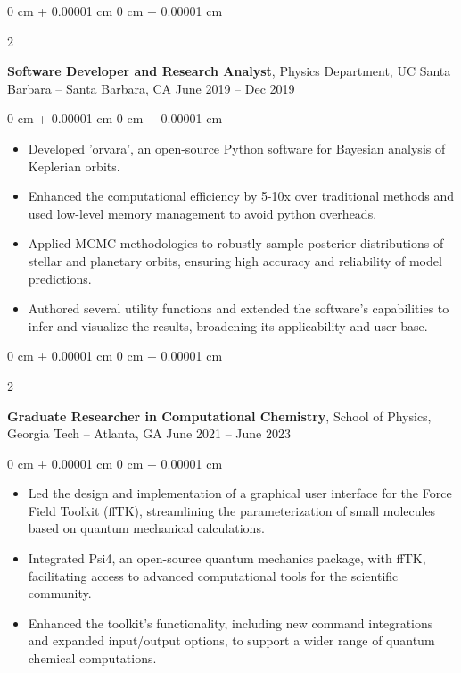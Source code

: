 \documentclass[10pt, letterpaper]{article}
\newenvironment{highlights}{
    \begin{itemize}[
        topsep=0.10 cm,
        parsep=0.10 cm,
        partopsep=0pt,
        itemsep=0pt,
        leftmargin=0 cm + 10pt
    ]
}{
    \end{itemize}
} %
\newenvironment{onecolentry}{
    \begin{adjustwidth}{
        0 cm + 0.00001 cm
    }{
        0 cm + 0.00001 cm
    }
}{
    \end{adjustwidth}
} %
\newenvironment{twocolentry}[2][]{
    \onecolentry
    \def\secondColumn{#2}
    \setcolumnwidth{\fill, 4.5 cm}
    \begin{paracol}{2}
}{
    \switchcolumn \raggedleft \secondColumn
    \end{paracol}
    \endonecolentry
} %
\begin{document}
        \vspace{0.2 cm}

        \begin{twocolentry}{
            June 2019 – Dec 2019
        }
            \textbf{Software Developer and Research Analyst}, Physics Department, UC Santa Barbara -- Santa Barbara, CA\end{twocolentry}

        \vspace{0.10 cm}
        \begin{onecolentry}
            \begin{highlights}
                \item Developed 'orvara', an open-source Python software for Bayesian analysis of Keplerian orbits.
                \item Enhanced the computational efficiency by 5-10x over traditional methods and used low-level memory management to avoid python overheads.
                \item Applied MCMC methodologies to robustly sample posterior distributions of stellar and planetary orbits, ensuring high accuracy and reliability of model predictions.
                \item Authored several utility functions and extended the software’s capabilities to infer and visualize the results, broadening its applicability and user base.
            \end{highlights}
        \end{onecolentry}


        \vspace{0.2 cm}

        \begin{twocolentry}{
            June 2021 – June 2023
        }
            \textbf{Graduate Researcher in Computational Chemistry}, School of Physics, Georgia Tech -- Atlanta, GA\end{twocolentry}

        \vspace{0.10 cm}
        \begin{onecolentry}
            \begin{highlights}
                \item Led the design and implementation of a graphical user interface for the Force Field Toolkit (ffTK), streamlining the parameterization of small molecules based on quantum mechanical calculations.
                \item Integrated Psi4, an open-source quantum mechanics package, with ffTK, facilitating access to advanced computational tools for the scientific community.
                \item Enhanced the toolkit's functionality, including new command integrations and expanded input/output options, to support a wider range of quantum chemical computations.
            \end{highlights}
        \end{onecolentry}
\end{document}
